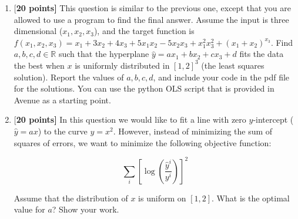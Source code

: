 \documentclass{article}
\begin{document}
\begin{enumerate}
    \item {[\bf 20 points]} This question is similar to the previous one, except that you are allowed to use a program to find the final answer. Assume the input is three dimensional ($x_1,x_2,x_3$), and the target function is $f(x_1,x_2,x_3)=x_1+3x_2+4x_3+5x_1x_2-5x_2x_3+x_1^2 x_3^2+ (x_1+x_2)^{x_3}$. Find $a, b, c, d\in \mathbb{R}$ such that the hyperplane $\hat{y}=ax_1+bx_2+cx_3+d$ fits the data the best when $x$ is uniformly distributed in $[1,2]^3$ (the least squares solution). Report the values of $a, b, c, d$, and include your code in the pdf file for the solutions. You can use the python OLS script that is provided in Avenue as a starting point.
    
    \item {[\bf 20 points]} In this question we would like to fit a line with zero $y$-intercept ($\hat{y}=ax$) to the curve $y=x^2$. However, instead of minimizing the sum of squares of errors, we want to minimize the following objective function:
    
    $$\sum_i \left[  \log \left(\frac{\hat{y}^i}{y^i}\right) \right]^2$$
    
    Assume that the distribution of $x$ is uniform on $[1,2]$. What is the optimal value for $a$? Show your work.
    
    
    

\end{enumerate}
\end{document}
